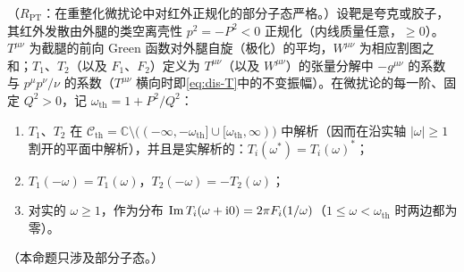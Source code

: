 \begin{proposition}\label{prop:dis-compton-analytic}
（$R_{\mathrm{PT}}$：在重整化微扰论中对红外正规化的部分子态严格。）设靶是夸克或胶子，其红外发散由外腿的类空离壳性 $p^2=-P^2<0$ 正规化（内线质量任意，$\ge0$）。$T^{\mu\nu}$ 为截腿的前向 Green 函数对外腿自旋（极化）的平均，$W^{\mu\nu}$ 为相应割图之和；$T_1$、$T_2$（以及 $F_1$、$F_2$）定义为 $T^{\mu\nu}$（以及 $W^{\mu\nu}$）的张量分解中 $-g^{\mu\nu}$ 的系数与 $p^\mu p^\nu/\nu$ 的系数（$T^{\mu\nu}$ 横向时即\cref{eq:dis-T}中的不变振幅）。在微扰论的每一阶、固定 $Q^2>0$，记 $\omega_{\mathrm{th}}=1+P^2/Q^2$：
\begin{enumerate}[label=(\alph*),leftmargin=2.2em,itemsep=0pt,topsep=2pt]
\item $T_1$、$T_2$ 在 $\mathcal C_{\mathrm{th}}=\mathbb C\setminus\big((-\infty,-\omega_{\mathrm{th}}]\cup[\omega_{\mathrm{th}},\infty)\big)$ 中解析（因而在沿实轴 $|\omega|\ge1$ 割开的平面中解析），并且是实解析的：$T_i(\omega^*)=T_i(\omega)^*$；
\item $T_1(-\omega)=T_1(\omega)$，$T_2(-\omega)=-T_2(\omega)$；
\item 对实的 $\omega\ge1$，作为分布 $\operatorname{Im} T_i(\omega+\mathrm{i}0)=2\pi F_i(1/\omega)$（$1\le\omega<\omega_{\mathrm{th}}$ 时两边都为零）。
\end{enumerate}
（本命题只涉及部分子态。）
\end{proposition}

